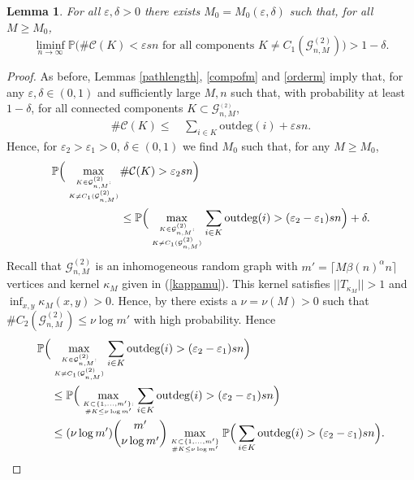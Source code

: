 \documentclass[12pt,a4paper]{article}
\numberwithin{equation}{section}
\newtheorem{lemma}[shared]{Lemma}
\begin{document}
\begin{lemma}\label{unique}
For all $\varepsilon, \delta>0$ there exists $M_0=M_0(\varepsilon, \delta)$ such that,
for all $M\ge M_0$,
$$
\liminf_{n\to\infty}
\mathbb P\Big( \#\mathcal C(K) < \varepsilon s n
\text{ for all components $K\not=C_1(\mathcal G^{(2)}_{n,M})$} \Big)>1-\delta.
$$
\end{lemma}

\begin{proof} As before, Lemmas \ref{pathlength}, \ref{compofm} and \ref{orderm} 
imply that, for any $\varepsilon,\delta \in (0,1)$ and sufficiently large $M,n$  such that, with probability at least $1-\delta$, for all connected components $K\subset \mathcal G^{_{(2)}}_{n,M} $, 
\begin{align*}
     \#\mathcal C(K) \le &\,  \sum_{i\in K} \text{outdeg}(i) +\varepsilon sn.
\end{align*}
{Hence, for $\varepsilon_2>\varepsilon_1>0$, $\delta\in(0,1)$ we find $M_0$ such that, for any 
$M\ge M_0$,}
\begin{align}
 \mathbb P \Big(  \max_{{K\in\mathcal{G}^{(2)}_{n,M}:}\atop{K\neq C_1(\mathcal{G}^{(2)}_{n,M})}} & \#\mathcal C(K)>\varepsilon_2 sn\Big) 
 \notag\\
& \leq   \mathbb P \Big(  \max_{{K\in\mathcal{G}^{(2)}_{n,M}:}\atop{K\neq C_1(\mathcal{G}^{(2)}_{n,M})}}\sum_{i\in K} \text{outdeg}(i)> (\varepsilon_2-\varepsilon_1) sn\Big)  + \delta. \label{schritt1}
\end{align}
Recall that $\mathcal G^{(2)}_{n,M}$ is an inhomogeneous random graph with $m'=\lceil M\beta(n)^{\alpha}n\rceil $ vertices and kernel $\kappa_M$ given in (\ref{kappamu}). This kernel satisfies $||T_{\kappa_M}||>1$ and $\inf_{x,y}\kappa_M(x,y)>0$. Hence, by \cite[Theorem 3.12, (ii)]{rjb} there exists a  $\nu=\nu(M)>0$ such that $\#C_2(\mathcal G^{(2)}_{n,M})\le \nu \log m'$ with high probability. Hence
\begin{align}
 \mathbb P \Big(  & \max_{{K\in\mathcal{G}^{(2)}_{n,M}:}\atop{K\neq C_1(\mathcal{G}^{(2)}_{n,M})}}\sum_{i\in K} \text{outdeg}(i)> (\varepsilon_2-\varepsilon_1) sn\Big) \notag \\
& \leq 
  \mathbb P \Big(\max_{{K\subset\{1,\dots,m'\}:}\atop{ \#K\le \nu \log m'}}\sum_{i\in K} \text{outdeg}(i) >(\varepsilon_2-\varepsilon_1) sn\Big) \notag\\ 
& \le   (\nu \log m') \binom{m'}{\nu \log m'} \max_{K\subset\{1,\dots,m'\}\atop \#K\le \nu \log m'} \mathbb P \Big(\sum_{i\in K} \text{outdeg}(i)>(\varepsilon_2-\varepsilon_1) sn\Big).

\end{align}
\end{proof}
\end{document}
